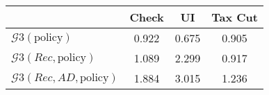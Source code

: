 \begin{tabular}{@{}lccc@{}} 
\toprule 
                          & Check      & UI    & Tax Cut    \\  \midrule 
$\mathcal{G}3(\text{policy})$ & 0.922  & 0.675  & 0.905     \\ 
$\mathcal{G}3(Rec,\text{policy})$ & 1.089  & 2.299  & 0.917     \\ 
$\mathcal{G}3(Rec, AD,\text{policy})$ & 1.884  & 3.015  & 1.236     \\ 
\end{tabular}  
